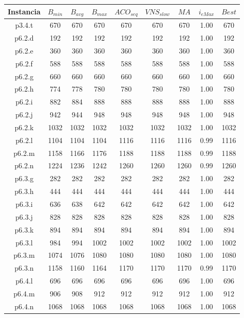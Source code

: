 \begin{table}
\begin{center}
\begin{tabular}{ |c|c|c|c|c|c|c|c|c| } 
\hline
Instancia & $B_{min}$ & $B_{avg}$ & $B_{max}$ & $ACO_{seq}$ & $VNS_{slow}$ & $MA$ & $i_{eMax}$ & $Best$ \\
\hline
p3.4.t & 670 & 670 & 670 & 670 & 670 & 670 & 1.00 & 670 \\
p6.2.d & 192 & 192 & 192 & 192 & 192 & 192 & 1.00 & 192 \\
p6.2.e & 360 & 360 & 360 & 360 & 360 & 360 & 1.00 & 360 \\
p6.2.f & 588 & 588 & 588 & 588 & 588 & 588 & 1.00 & 588 \\
p6.2.g & 660 & 660 & 660 & 660 & 660 & 660 & 1.00 & 660 \\
p6.2.h & 774 & 778 & 780 & 780 & 780 & 780 & 1.00 & 780 \\
p6.2.i & 882 & 884 & 888 & 888 & 888 & 888 & 1.00 & 888 \\
p6.2.j & 942 & 944 & 948 & 948 & 948 & 948 & 1.00 & 948 \\
p6.2.k & 1032 & 1032 & 1032 & 1032 & 1032 & 1032 & 1.00 & 1032 \\
p6.2.l & 1104 & 1104 & 1104 & 1116 & 1116 & 1116 & 0.99 & 1116 \\
p6.2.m & 1158 & 1166 & 1176 & 1188 & 1188 & 1188 & 0.99 & 1188 \\
p6.2.n & 1224 & 1236 & 1242 & 1260 & 1260 & 1260 & 0.99 & 1260 \\
p6.3.g & 282 & 282 & 282 & 282 & 282 & 282 & 1.00 & 282 \\
p6.3.h & 444 & 444 & 444 & 444 & 444 & 444 & 1.00 & 444 \\
p6.3.i & 636 & 638 & 642 & 642 & 642 & 642 & 1.00 & 642 \\
p6.3.j & 828 & 828 & 828 & 828 & 828 & 828 & 1.00 & 828 \\
p6.3.k & 894 & 894 & 894 & 894 & 894 & 894 & 1.00 & 894 \\
p6.3.l & 984 & 994 & 1002 & 1002 & 1002 & 1002 & 1.00 & 1002 \\
p6.3.m & 1074 & 1076 & 1080 & 1080 & 1080 & 1080 & 1.00 & 1080 \\
p6.3.n & 1158 & 1160 & 1164 & 1170 & 1170 & 1170 & 0.99 & 1170 \\
p6.4.l & 696 & 696 & 696 & 696 & 696 & 696 & 1.00 & 696 \\
p6.4.m & 906 & 908 & 912 & 912 & 912 & 912 & 1.00 & 912 \\
p6.4.n & 1068 & 1068 & 1068 & 1068 & 1068 & 1068 & 1.00 & 1068 \\

\end{tabular}
\end{center}
\end{table}
